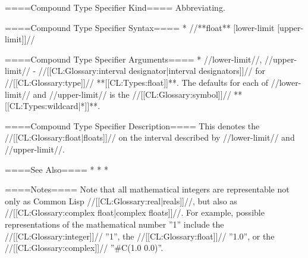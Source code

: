 ====Compound Type Specifier Kind====
Abbreviating.

====Compound Type Specifier Syntax====
  * //**float** [lower-limit [upper-limit]]//

====Compound Type Specifier Arguments====
  * //lower-limit//, //upper-limit// - //[[CL:Glossary:interval designator|interval designators]]// for //[[CL:Glossary:type]]// **[[CL:Types:float]]**. The defaults for each of //lower-limit// and //upper-limit// is the //[[CL:Glossary:symbol]]// **[[CL:Types:wildcard|*]]**.
  
====Compound Type Specifier Description====
This denotes the //[[CL:Glossary:float|floats]]// on the interval described by //lower-limit// and //upper-limit//. 

====See Also====
  * {\figref\SyntaxForNumericTokens}
  * {\secref\NumsFromTokens}
  * {\secref\PrintingFloats}

====Notes====
Note that all mathematical integers are representable not only as Common Lisp //[[CL:Glossary:real|reals]]//, but also as //[[CL:Glossary:complex float|complex floats]]//. For example, possible representations of the mathematical number ''1'' include the //[[CL:Glossary:integer]]// ''1'', the //[[CL:Glossary:float]]// ''1.0'', or the //[[CL:Glossary:complex]]// ''#C(1.0 0.0)''.

